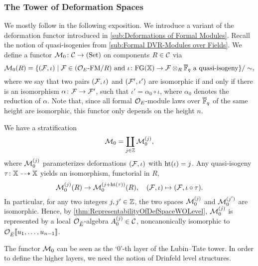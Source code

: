 \documentclass[../main.tex]{subfiles}
\begin{document}
\subsubsection{The Tower of Deformation Spaces} %
\label{ssub:The Tower of Deformation Spaces}
We mostly follow \cite[Chapter 2]{Strauch2008DefSp} in the following
exposition. We introduce a variant of the deformation functor introduced in \cref{sub:Deformations of Formal Modules}. 
Recall the notion of quasi-isogenies from \cref{sub:Formal DVR-Modules over Fields}.
We define a functor $\mathcal{M}_0\colon \mathcal{C} \to {(\mathrm{Set})}$ on components $R \in \mathcal{C}$ via
\begin{equation*}
  \mathcal{M}_0(R) = \{(\mathcal{F}, \iota) \mid \mathcal{F} \in {({\mathcal{O}_E}\textnormal-\allowbreak\mathrm{FM}/{R})} \text { and }
  \iota\colon \textnormal{FG}(\mathbb{X}) \to \mathcal{F} \otimes_R {\overline {\mathbb{F}}_q} \text{ a quasi-isogeny}\}/\sim,
\end{equation*}
where we say that two pairs $(\mathcal{F}, \iota)$ and $(\mathcal{F}', \iota')$ are isomorphic
if and only if there is an isomorphism $\alpha \colon \mathcal{F} \to \mathcal{F}'$,
such that $\iota' = \alpha_0 \circ \iota$, where $\alpha_0$ denotes the reduction
of $\alpha$. Note that, since all formal $\mathcal{O}_E$-module laws over ${\overline {\mathbb{F}}_q}$ of the same height
are isomorphic, this functor only depends on the height $n$.

We have a stratification
\begin{equation*}
  \mathcal{M}_0 = \coprod_{j \in \mathbb{Z}} \mathcal{M}_0^{(j)},
\end{equation*}
where $\mathcal{M}_0^{(j)}$ parameterizes deformations $(\mathcal{F}, \iota)$ with $\textnormal{ht}(\iota) = j$. 
Any quasi-isogeny $\tau\colon \mathbb{X} \dashrightarrow \mathbb{X}$ yields an isomorphism, 
functorial in $R$,
\begin{equation*}
  \mathcal{M}_0^{(j)}(R) \to \mathcal{M}_0^{(j + \textnormal{ht}(\tau))}(R), \quad
  (\mathcal{F}, \iota) \mapsto (\mathcal{F}, \iota \circ \tau). 
\end{equation*}
In particular, for any two integers $j, j' \in \mathbb{Z}$, the two spaces
$\mathcal{M}_0^{(j)}$ and $\mathcal{M}_0^{(j')}$ are isomorphic. Hence, by
\cref{thm:RepresentabilityOfDefSpaceWOLevel}, $\mathcal{M}_0^{(j)}$ is represented by
a local $\mathcal{O}_{\breve {E}}$-algebra $A^{(j)}_0 \in \mathcal{C}$, noncanonically isomorphic
to $\mathcal{O}_{\breve {E}} \llbracket u_1, \dots, u_{n-1} \rrbracket$.

The functor $\mathcal{M}_0$ can be seen as the ‘$0$’-th layer of the Lubin--Tate tower. 
In order to define the higher layers, we need the notion of Drinfeld level structures.
\end{document}
